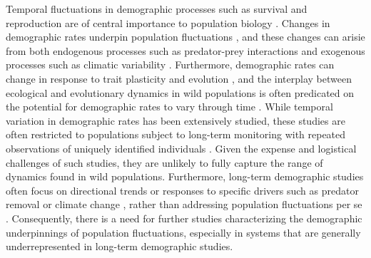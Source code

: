 \documentclass[11pt]{article}
\begin{document}
Temporal fluctuations in demographic processes such as survival and reproduction
are of central importance to population biology
\citep{twombly1994,fox2000population,koons2016life}.
Changes in demographic rates underpin population fluctuations \citep{coulson2005decomposing},
and these changes can arisie from both 
endogenous processes such as predator-prey interactions 
\citep{rosenzweig1963}
and exogenous processes such as climatic variability
\citep{elton1924}.
Furthermore, demographic rates can change in response to trait plasticity and evolution
\citep{ellner2011does, bonnet2019role},
and the interplay between ecological and evolutionary dynamics in wild populations 
is often predicated on the potential for demographic rates to vary through time
\citep{coulson2006putting, siepielski2009s, ozgul2010coupled, ellner2011does}.
While temporal variation in demographic rates has been extensively studied,
these studies are often restricted to populations subject to long-term monitoring
with repeated observations of uniquely identified individuals 
\citep[e.g., mark-recapture;][]{fujiwara2002}.
Given the expense and logistical challenges of such studies, 
they are unlikely to fully capture the range of dynamics found in wild populations.
Furthermore, long-term demographic studies often focus on directional trends
or responses to specific drivers such as predator removal 
\citep[e.g., ][]{ diller2016demographic}
or climate change \citep{hunter2010climate},
rather than addressing 
population fluctuations per se \citep[but see][]
{white2007irruptive, koons2017understanding, taylor2018demographic, hoy2020fluctuations}.
Consequently, 
there is a need for further studies characterizing the demographic underpinnings 
of population fluctuations, 
especially in systems that are generally underrepresented 
in long-term demographic studies.
\end{document}
